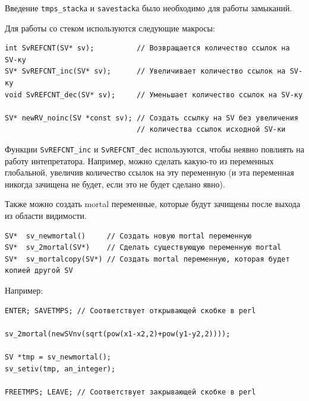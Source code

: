 \begin{figure}[H]
\end{figure}\noindent
Введение \verb|tmps_stack|а и \verb|savestack|а было необходимо для работы замыканий.

Для работы со стеком используются следующие макросы:
\begin{verbatim}
int SvREFCNT(SV* sv);          // Возвращается количество ссылок на SV-ку
SV* SvREFCNT_inc(SV* sv);      // Увеличивает количество ссылок на SV-ку
void SvREFCNT_dec(SV* sv);     // Уменьшает количество ссылок на SV-ку

SV* newRV_noinc(SV *const sv); // Создать ссылку на SV без увеличения
                               // количества ссылок исходной SV-ки
\end{verbatim}
Функции \verb|SvREFCNT_inc| и \verb|SvREFCNT_dec| используются, чтобы неявно повлиять на работу интепретатора. Например, можно сделать какую-то из переменных глобальной, увеличив количество ссылок на эту переменную (и эта переменная никогда зачищена не будет, если это не будет сделано явно).

Также можно создать mortal переменные, которые будут зачищены после выхода из области видимости.
\begin{verbatim}
SV*  sv_newmortal()     // Создать новую mortal переменную
SV*  sv_2mortal(SV*)    // Сделать существующую переменную mortal
SV*  sv_mortalcopy(SV*) // Создать mortal переменную, которая будет копией другой SV
\end{verbatim}
Например:
\begin{verbatim}
ENTER; SAVETMPS; // Соответствует открывающей скобке в perl

sv_2mortal(newSVnv(sqrt(pow(x1-x2,2)+pow(y1-y2,2))));

SV *tmp = sv_newmortal();
sv_setiv(tmp, an_integer);

FREETMPS; LEAVE; // Соответствует закрывающей скобке в perl
\end{verbatim}

